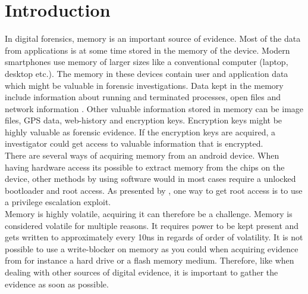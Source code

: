 \section{Introduction}


In digital forensics, memory is an important source of evidence. Most of the data from applications is at some time 
stored in the memory of the device. Modern smartphones use memory of larger sizes like a conventional computer (laptop, 
desktop etc.). The memory in these devices contain user and application data which might be valuable in forensic 
investigations. Data kept in the memory include information about running and terminated processes, open files and 
network information \cite{acq_vol_android_mem}. Other valuable information stored in memory can be image files, GPS data, 
web-history and encryption keys. Encryption keys might be highly valuable as forensic evidence. If the encryption keys 
are acquired, a investigator could get access to valuable information that is encrypted. \\

There are several ways of acquiring memory from an android device. When having hardware access its possible 
to extract memory from the chips on the device, other methods by using software would in most cases require 
a unlocked bootloader and root access. As presented by \cite{acq_vol_android_mem}, 
one way to get root access is to use a privilege escalation exploit. \\%




Memory is highly volatile, acquiring it can therefore be a challenge. Memory is considered volatile for multiple reasons. 
It requires  power to be kept present \cite{the_art_of_mem} and gets written to approximately every 10ns in regards of 
order of volatility. %
It is not possible to use a write-blocker on memory as you could when acquiring evidence from for instance a hard drive 
or a flash memory medium. Therefore, like when dealing with other sources of digital evidence, it is important to gather 
the evidence as soon as possible. \\

